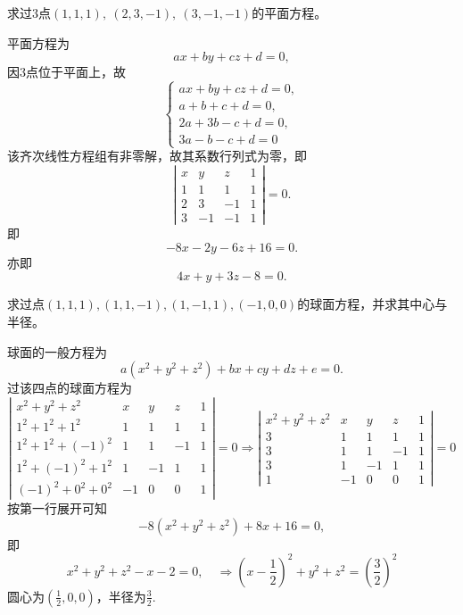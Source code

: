 \begin{frame}
  \begin{footnotesize}
    \begin{exampleblock}{48}
      求过3点$(1,1,1), ~(2,3,-1), ~(3,-1,-1)$的平面方程。
    \end{exampleblock}
    \pause
    \jiename
    平面方程为
    $$
    ax+by+cz+d=0,
    $$
    因3点位于平面上，故
    $$
    \left\{
    \begin{array}{r}
      ax+by+cz+d=0,\\
      a+b+c+d=0, \\
      2a+3b-c+d=0, \\
      3a-b-c+d=0
    \end{array}
    \right.
    $$
    该齐次线性方程组有非零解，故其系数行列式为零，即
    $$
    \left|
    \begin{array}{rrrr}
      x&y&z&1\\
      1&1&1&1\\
      2&3&-1&1\\
      3&-1&-1&1
    \end{array}
    \right|=0.
    $$
    即
    $$
    -8 x - 2y -6z +16=0.
    $$
    亦即
    $$
    4x+y+3z-8=0.
    $$
  \end{footnotesize}
\end{frame}


\begin{frame}
  \begin{footnotesize}
    \begin{exampleblock}{49}
      求过点$(1,1,1), (1,1,-1), (1,-1,1), (-1,0,0)$的球面方程，并求其中心与半径。
    \end{exampleblock}
    \pause
    \jiename
    球面的一般方程为
    $$
    a(x^2+y^2+z^2)+bx+cy+dz+e=0.
    $$
    过该四点的球面方程为
    $$
    \left|
    \begin{array}{rrrrr}
      x^2+y^2+z^2&x&y&z&1\\[0.1cm]
      1^2+1^2+1^2&1&1&1&1\\[0.1cm]
      1^2+1^2+(-1)^2&1&1&-1&1\\[0.1cm]
      1^2+(-1)^2+1^2&1&-1&1&1\\[0.1cm]
      (-1)^2+0^2+0^2&-1&0&0&1
    \end{array}
    \right| = 0 \Rightarrow
    \left|
    \begin{array}{rrrrr}
      x^2+y^2+z^2&x&y&z&1\\[0.1cm]
      3&1&1&1&1\\[0.1cm]
      3&1&1&-1&1\\[0.1cm]
      3&1&-1&1&1\\[0.1cm]
      1&-1&0&0&1
    \end{array}
    \right| = 0
    $$
    \pause 
    按第一行展开可知
    $$
    -8(x^2+y^2+z^2) + 8x +16=0,
    $$
    即
    $$
    x^2+y^2+z^2-x-2=0, \quad \Rightarrow
    (x-\frac12)^2+y^2+z^2=(\frac32)^2
    $$
    圆心为$(\frac12, 0, 0)$，半径为$\frac32$.
  \end{footnotesize}
\end{frame}


